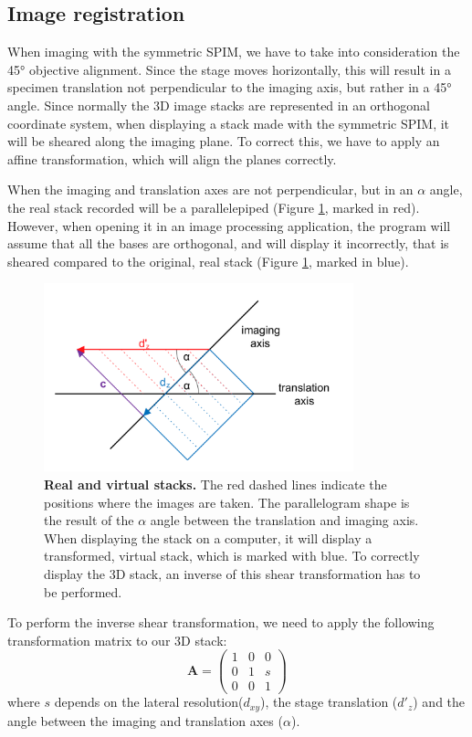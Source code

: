 \documentclass{diploma_style}
\begin{document}
\subsection{Image registration}
\label{affine}
When imaging with the symmetric SPIM, we have to take into consideration the 45° objective alignment. Since the stage moves horizontally, this will result in a specimen translation not perpendicular to the imaging axis, but rather in a 45° angle. Since normally the 3D image stacks are represented in an orthogonal coordinate system, when displaying a stack made with the symmetric SPIM, it will be sheared along the imaging plane. To correct this, we have to apply an affine transformation, which will align the planes correctly.

When the imaging and translation axes are not perpendicular, but in an $\alpha$ angle, the real stack recorded will be a parallelepiped (Figure \ref{fig:affine}, marked in red). However, when opening it in an image processing application, the program will assume that all the bases are orthogonal, and will display it incorrectly, that is sheared compared to the original, real stack (Figure \ref{fig:affine}, marked in blue).
\begin{figure}[htb]
	\centering
	\includegraphics[width=0.8\textwidth]{figures/2_spim/affine}
	\caption{\textbf{Real and virtual stacks.} The red dashed lines indicate the positions where the images are taken. The parallelogram shape is the result of the $\alpha$ angle between the translation and imaging axis. When displaying the stack on a computer, it will display a transformed, virtual stack, which is marked with blue. To correctly display the 3D stack, an inverse of this shear transformation has to be performed.}
	\label{fig:affine}
\end{figure}

To perform the inverse shear transformation, we need to apply the following transformation matrix to our 3D stack:
\begin{equation}
	\mathbf{A}=\begin{pmatrix}
		1 & 0 & 0 \\
		0 & 1 & s \\
		0 & 0 & 1
	\end{pmatrix}
\end{equation}
where $s$ depends on the lateral resolution($d_{xy}$), the stage translation ($d'_z$) and the angle between the imaging and translation axes ($\alpha$).
\end{document}
